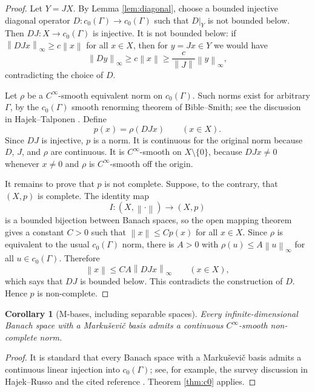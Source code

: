 \documentclass[11pt]{article}
\newtheorem{corollary}{Corollary}
\theoremstyle{definition}
\newcommand{\norm}[1]{\left\lVert #1 \right\rVert}
\begin{document}
\begin{proof}
Let \(Y=JX\).  By Lemma \ref{lem:diagonal}, choose a bounded injective
diagonal operator \(D:c_0(\Gamma)\to c_0(\Gamma)\) such that \(D|_Y\) is not
bounded below.  Then \(DJ:X\to c_0(\Gamma)\) is injective.  It is not bounded
below: if \(\norm{DJx}_\infty\geq c\norm{x}\) for all \(x\in X\), then for
\(y=Jx\in Y\) we would have
\[
    \norm{Dy}_\infty\geq c\norm{x}\geq \frac{c}{\norm{J}}\norm{y}_\infty,
\]
contradicting the choice of \(D\).

Let \(\rho\) be a \(C^\infty\)-smooth equivalent norm on \(c_0(\Gamma)\).
Such norms exist for arbitrary \(\Gamma\), by the \(c_0(\Gamma)\) smooth
renorming theorem of Bible--Smith; see the discussion in
Hajek--Talponen \cite{HT}.  Define
\[
    p(x)=\rho(DJx)\qquad(x\in X).
\]
Since \(DJ\) is injective, \(p\) is a norm.  It is continuous for the original
norm because \(D\), \(J\), and \(\rho\) are continuous.  It is
\(C^\infty\)-smooth on \(X\setminus\{0\}\), because \(DJx\neq 0\) whenever
\(x\neq 0\) and \(\rho\) is \(C^\infty\)-smooth off the origin.

It remains to prove that \(p\) is not complete.  Suppose, to the contrary, that
\((X,p)\) is complete.  The identity map
\[
    I:(X,\norm{\cdot})\longrightarrow (X,p)
\]
is a bounded bijection between Banach spaces, so the open mapping theorem gives
a constant \(C>0\) such that \(\norm{x}\leq C p(x)\) for all \(x\in X\).  Since
\(\rho\) is equivalent to the usual \(c_0(\Gamma)\) norm, there is \(A>0\) with
\(\rho(u)\leq A\norm{u}_\infty\) for all \(u\in c_0(\Gamma)\).  Therefore
\[
    \norm{x}\leq CA\norm{DJx}_\infty\qquad(x\in X),
\]
which says that \(DJ\) is bounded below.  This contradicts the construction of
\(D\).  Hence \(p\) is non-complete.
\end{proof}

\begin{corollary}[M-bases, including separable spaces]
Every infinite-dimensional Banach space with a Marku\v{s}evi\v{c} basis admits
a continuous \(C^\infty\)-smooth non-complete norm.
\end{corollary}

\begin{proof}
It is standard that every Banach space with a Marku\v{s}evi\v{c} basis admits
a continuous linear injection into \(c_0(\Gamma)\); see, for example, the
survey discussion in Hajek--Russo \cite{HRsurvey} and the cited reference
\cite[Theorem II.2.4]{DGZ}.  Theorem \ref{thm:c0} applies.
\end{proof}
\end{document}
